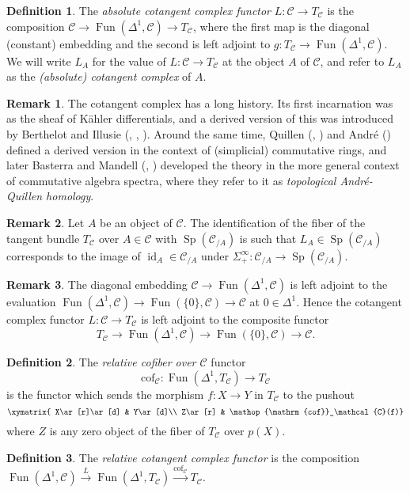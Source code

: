 \documentclass[12pt]{article}
\theoremstyle{definition}
\newtheorem{definition}{Definition}[subsection]
\newtheorem{remark}{Remark}[subsection]
\newcommand{\C}{\mathcal{C}}
\newcommand{\too}{\longrightarrow}
\DeclareMathOperator{\cof}{cof}
\DeclareMathOperator{\Fun}{Fun}
\DeclareMathOperator{\id}{id}
\DeclareMathOperator{\Sp}{Sp}
\begin{document}
\begin{definition}
The {\em absolute cotangent complex functor}
$L:\C\to T_\C$ is  the composition $\C\to\Fun(\Delta^1,\C)\to T_\C$, where the first map is the diagonal (constant) embedding and the second is left adjoint to $g:T_\C\to\Fun(\Delta^1,\C)$.
We will write $L_A$ for the value of $L:\C\to T_\C$ at the object $A$ of $\C$, and refer to $L_A$ as the {\em (absolute) cotangent complex} of $A$.
\end{definition}
\begin{remark}
The cotangent complex has a long history.
Its first incarnation was as the sheaf of K\"ahler differentials, and a derived version of this was introduced by Berthelot and Illusie (\cite{SGA6}, \cite{Il71}, \cite{Il72}). 
Around the same time, Quillen (\cite{Qu67}, \cite{Qu70}) and Andr\'e (\cite{An74}) defined a derived version in the context of (simplicial) commutative rings, and later Basterra and Mandell (\cite{Ba99}, \cite{BM05}) developed the theory in the more general context of commutative algebra spectra, where they refer to it as {\em topological Andr\'e-Quillen homology}.
\end{remark}
\begin{remark}
Let $A$ be an object of $\C$.
The identification of the fiber of the tangent bundle $T_\C$ over $A\in\C$ with $\Sp(\C_{/A})$ is such that $L_A\in\Sp(\C_{/A})$ corresponds to the image of $\id_A\in\C_{/A}$ under  $\Sigma^\infty_+:\C_{/A}\to\Sp(\C_{/A})$.
\end{remark}
\begin{remark}
The diagonal embedding $\C\to\Fun(\Delta^1,\C)$ is left adjoint to the evaluation $\Fun(\Delta^1,\C)\to\Fun(\{0\},\C)\to\C$ at $0\in\Delta^1$. Hence the cotangent complex functor $L:\C\to T_\C$ is left adjoint to the composite functor
\[
T_\C\too\Fun(\Delta^1,\C)\too\Fun(\{0\},\C)\to\C.
\]
\end{remark}
\begin{definition}
The {\em relative cofiber over $\C$} functor
\[
\mathrm{cof}_\C\colon\Fun(\Delta^1,T_\C)\to T_\C
\]
is the functor which sends the morphism $f:X\to Y$ in $T_\C$ to the pushout
\[
\xymatrix{
X\ar[r]\ar[d] & Y\ar[d]\\
Z\ar[r] & \cof_\C(f)}
\]
where $Z$ is any zero object of the fiber of $T_\C$ over $p(X)$.
\end{definition}
\begin{definition}
The {\em relative cotangent complex functor} is the composition
$
\Fun(\Delta^1,\C)\overset{L}{\too}\Fun(\Delta^1,T_\C)\overset{\mathrm{cof}_\C}{\too} T_\C.
$
\end{definition}
\end{document}
